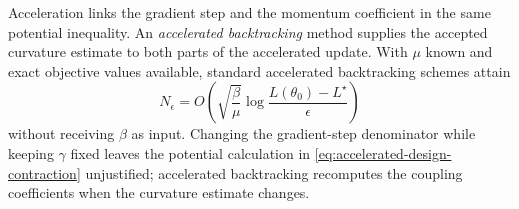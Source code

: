 \documentclass[11pt,twoside]{article}
\theoremstyle{definition}
\theoremstyle{remark}
\begin{document}
Acceleration links the gradient step and the momentum coefficient in the same
potential inequality. An \emph{accelerated backtracking} method supplies the
accepted curvature estimate to both parts of the accelerated update. With
$\mu$ known and exact objective values available, standard accelerated
backtracking schemes attain
\begin{equation}
 N_\epsilon
 =O\left(\sqrt{\frac\beta\mu}
       \log\frac{L(\theta_0)-L^\star}{\epsilon}\right)
 \label{eq:accelerated-backtracking-rate}
\end{equation}
without receiving $\beta$ as input. Changing the gradient-step denominator
while keeping $\gamma$ fixed leaves the potential calculation in
\cref{eq:accelerated-design-contraction} unjustified; accelerated
backtracking recomputes the coupling coefficients when the curvature estimate
changes.
\end{document}
